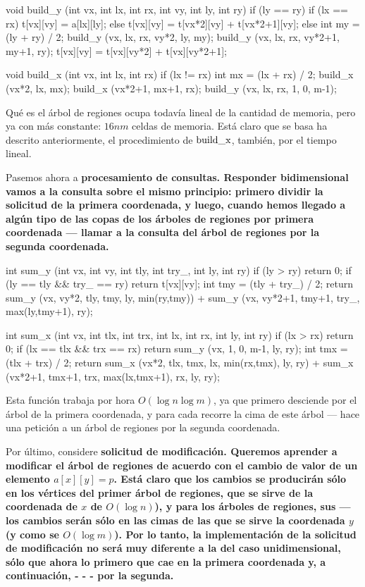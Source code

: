 \code
void build_y (int vx, int lx, int rx, int vy, int ly, int ry) {
if (ly == ry)
if (lx == rx)
t[vx][vy] = a[lx][ly];
else
t[vx][vy] = t[vx*2][vy] + t[vx*2+1][vy];
else {
int my = (ly + ry) / 2;
build_y (vx, lx, rx, vy*2, ly, my);
build_y (vx, lx, rx, vy*2+1, my+1, ry);
t[vx][vy] = t[vx][vy*2] + t[vx][vy*2+1];
}
}

void build_x (int vx, int lx, int rx) {
if (lx != rx) {
int mx = (lx + rx) / 2;
build_x (vx*2, lx, mx);
build_x (vx*2+1, mx+1, rx);
}
build_y (vx, lx, rx, 1, 0, m-1);
}
\endcode

Qué es el árbol de regiones ocupa todavía lineal de la cantidad de memoria, pero ya con más constante: $16 n m$ celdas de memoria. Está claro que se basa ha descrito anteriormente, el procedimiento de $\rm build\_x$, también, por el tiempo lineal.

Pasemos ahora a \bf{procesamiento de consultas}. Responder bidimensional vamos a la consulta sobre el mismo principio: primero dividir la solicitud de la primera coordenada, y luego, cuando hemos llegado a algún tipo de las copas de los árboles de regiones por primera coordenada --- llamar a la consulta del árbol de regiones por la segunda coordenada.

\code
int sum_y (int vx, int vy, int tly, int try_, int ly, int ry) {
if (ly > ry)
return 0;
if (ly == tly && try_ == ry)
return t[vx][vy];
int tmy = (tly + try_) / 2;
return sum_y (vx, vy*2, tly, tmy, ly, min(ry,tmy))
+ sum_y (vx, vy*2+1, tmy+1, try_, max(ly,tmy+1), ry);
}

int sum_x (int vx, int tlx, int trx, int lx, int rx, int ly, int ry) {
if (lx > rx)
return 0;
if (lx == tlx && trx == rx)
return sum_y (vx, 1, 0, m-1, ly, ry);
int tmx = (tlx + trx) / 2;
return sum_x (vx*2, tlx, tmx, lx, min(rx,tmx), ly, ry)
+ sum_x (vx*2+1, tmx+1, trx, max(lx,tmx+1), rx, ly, ry);
}
\endcode

Esta función trabaja por hora $O (\log n \log m)$, ya que primero desciende por el árbol de la primera coordenada, y para cada recorre la cima de este árbol --- hace una petición a un árbol de regiones por la segunda coordenada.

Por último, considere \bf{solicitud de modificación}. Queremos aprender a modificar el árbol de regiones de acuerdo con el cambio de valor de un elemento $a[x][y] = p$. Está claro que los cambios se producirán sólo en los vértices del primer árbol de regiones, que se sirve de la coordenada de $x$ de $O (\log n)$), y para los árboles de regiones, sus --- los cambios serán sólo en las cimas de las que se sirve la coordenada $y$ (y como se $O (\log m)$). Por lo tanto, la implementación de la solicitud de modificación no será muy diferente a la del caso unidimensional, sólo que ahora lo primero que cae en la primera coordenada y, a continuación, - - - por la segunda.

